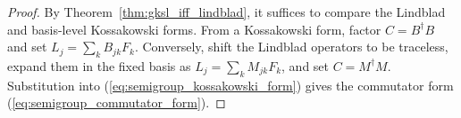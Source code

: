 \begin{proof}
    \leanok
    By Theorem~\ref{thm:gksl_iff_lindblad}, it suffices to compare the
    Lindblad and basis-level Kossakowski forms. From a Kossakowski form,
    factor $C=B^\dagger B$ and set $L_j=\sum_kB_{jk}F_k$.
    Conversely, shift the Lindblad operators to be traceless, expand them in
    the fixed basis as $L_j=\sum_kM_{jk}F_k$, and set $C=M^\dagger M$.
    Substitution into (\ref{eq:semigroup_kossakowski_form}) gives the
    commutator form (\ref{eq:semigroup_commutator_form}).
\end{proof}


